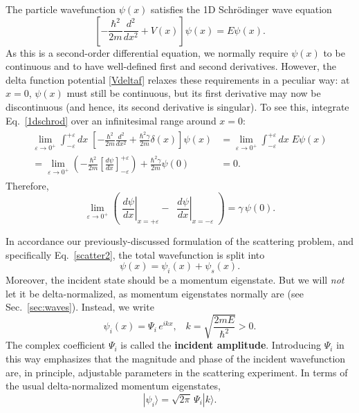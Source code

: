\documentclass[prx,12pt]{revtex4-2}
\begin{document}
The particle wavefunction $\psi(x)$ satisfies the 1D Schr\"odinger
wave equation
\begin{equation}
  \left[-\frac{\hbar^2}{2m} \frac{d^2}{dx^2} + V(x) \right] \psi(x)
  = E \psi(x).
  \label{1dschrod}
\end{equation}
As this is a second-order differential equation, we normally require
$\psi(x)$ to be continuous and to have well-defined first and second
derivatives.  However, the delta function potential \eqref{Vdeltaf}
relaxes these requirements in a peculiar way: at $x=0$, $\psi(x)$ must
still be continuous, but its first derivative may now be discontinuous
(and hence, its second derivative is singular).  To see this,
integrate Eq.~\eqref{1dschrod} over an infinitesimal range around $x =
0$:
\begin{align}
  \begin{aligned}\lim_{\varepsilon\rightarrow 0^+} \int_{-\varepsilon}^{+\varepsilon} dx\; \left[-\frac{\hbar^2}{2m} \frac{d^2}{dx^2} + \frac{\hbar^2\gamma}{2m} \delta(x)\right] \psi(x) &= \lim_{\varepsilon\rightarrow 0^+} \int_{-\varepsilon}^{+\varepsilon} dx\; E \psi(x) \\ = \lim_{\varepsilon\rightarrow 0^+} \left(-\frac{\hbar^2}{2m} \left[\frac{d\psi}{dx}\right]_{-\varepsilon}^{+\varepsilon} \right) + \frac{\hbar^2\gamma}{2m} \psi(0) &= 0.
  \end{aligned}
\end{align}
Therefore,
\begin{equation}
  \lim_{\varepsilon\rightarrow 0^+} \left(\; \left.\frac{d\psi}{dx}\right|_{x = +\varepsilon} - \;\; \left.\frac{d\psi}{dx}\right|_{x = -\varepsilon}\; \right) =  \gamma \,\psi(0).
  \label{delta_discontinuity}
\end{equation}

In accordance our previously-discussed formulation of the scattering
problem, and specifically Eq.~\eqref{scatter2}, the total wavefunction
is split into
\begin{equation}
  \psi(x) = \psi_i(x) + \psi_s(x).
\end{equation}
Moreover, the incident state should be a momentum eigenstate.  But we
will \textit{not} let it be delta-normalized, as momentum eigenstates
normally are (see Sec.~\ref{sec:waves}).  Instead, we write
\begin{equation}
  \psi_i(x) = \Psi_i \, e^{ik x},
  \;\;\;k = \sqrt{\frac{2mE}{\hbar^2}} > 0.
  \label{psiin1d}
\end{equation}
The complex coefficient $\Psi_i$ is called the \textbf{incident
  amplitude}.  Introducing $\Psi_i$ in this way emphasizes that the
magnitude and phase of the incident wavefunction are, in principle,
adjustable parameters in the scattering experiment.  In terms of the
usual delta-normalized momentum eigenstates,
\begin{equation}
  |\psi_i\rangle = \sqrt{2\pi}\, \Psi_i |k\rangle.
\end{equation}
\end{document}
